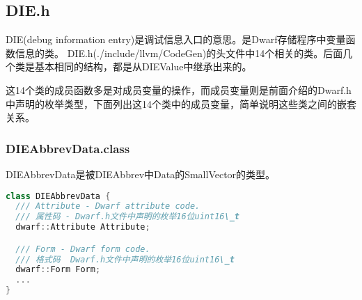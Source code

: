\documentclass{ctexart}
\begin{document}
\subsection{DIE.h}
DIE(debug information entry)是调试信息入口的意思。是Dwarf存储程序中变量函数信息的类。
DIE.h(./include/llvm/CodeGen)的头文件中14个相关的类。后面几个类是基本相同的结构，都是从DIEValue中继承出来的。


这14个类的成员函数多是对成员变量的操作，而成员变量则是前面介绍的Dwarf.h中声明的枚举类型，下面列出这14个类中的成员变量，简单说明这些类之间的嵌套关系。

\subsubsection{DIEAbbrevData.class}
DIEAbbrevData是被DIEAbbrev中Data的SmallVector的类型。
\begin{lstlisting}[language=c++]
class DIEAbbrevData {
  /// Attribute - Dwarf attribute code.
  /// 属性码 - Dwarf.h文件中声明的枚举16位uint16\_t
  dwarf::Attribute Attribute;

  /// Form - Dwarf form code.
  /// 格式码  Dwarf.h文件中声明的枚举16位uint16\_t
  dwarf::Form Form;
  ...
}
\end{lstlisting}
\end{document}
